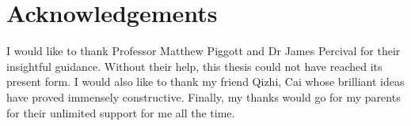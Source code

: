 \section*{Acknowledgements}
I would like to thank Professor Matthew Piggott and Dr James Percival for their insightful guidance. Without their help, this thesis could not have reached its present form. I would also like to thank my friend Qizhi, Cai whose brilliant ideas have proved immensely constructive. Finally, my thanks would go for my parents for their unlimited support for me all the time.